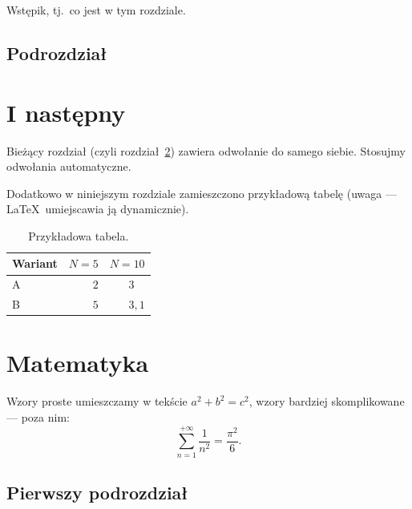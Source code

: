 \documentclass[12pt,a4paper,twoside,openany]{book}
\begin{document}
Wstępik, tj.~co jest w tym rozdziale.

\section{Podrozdział}



\chapter{I następny}
\label{sec:nast}

Bieżący rozdział (czyli rozdział~\ref{sec:nast}) zawiera odwołanie do samego siebie. Stosujmy odwołania automatyczne.

Dodatkowo w niniejszym rozdziale zamieszczono przykładową tabelę (uwaga --- \LaTeX\ umiejscawia ją dynamicznie).



\begin{table}[h]
\centering
\caption{Przykładowa tabela.}
\label{tab:przyklad}
\footnotesize
\begin{tabular}{|l|r|r|}
\hline
Wariant & $N=5$ & $N=10$\\
\hline
A & $2$ & $3\phantom{{,}1}$ \\
B & $5$ & $3{,}1$ \\

\hline
\end{tabular} 
\end{table}

\clearpage

\chapter{Matematyka}

Wzory proste umieszczamy w tekście $a^2+b^2=c^2$, wzory bardziej skomplikowane --- poza nim:
\begin{equation}
\sum_{n=1}^{+\infty}\frac{1}{n^2}=\frac{\pi^2}{6}.
\end{equation}

\section{Pierwszy podrozdział}
\end{document}
